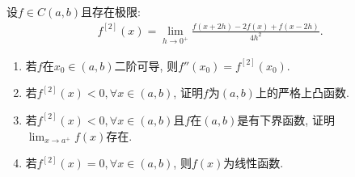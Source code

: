 \documentclass[../../main.tex]{subfiles}%
\begin{document}
\begin{example}
设$f \in C(a,b)$且存在极限:
\begin{align}
f^{[2]}(x) = \lim_{h \to 0^+} \frac{f(x+2h) - 2f(x) + f(x-2h)}{4h^2}. \label{eq:13.109}
\end{align}
\begin{enumerate}
\item 若$f$在$x_0 \in (a,b)$二阶可导, 则$f''(x_0) = f^{[2]}(x_0)$.

\item 若$f^{[2]}(x) < 0, \forall x \in (a,b)$, 证明$f$为$(a,b)$上的严格上凸函数.

\item 若$f^{[2]}(x) < 0, \forall x \in (a,b)$且$f$在$(a,b)$是有下界函数, 证明$\lim_{x \to a^+} f(x)$存在.

\item 若$f^{[2]}(x) = 0, \forall x \in (a,b)$, 则$f(x)$为线性函数.
\end{enumerate}
\end{example}
\end{document}
